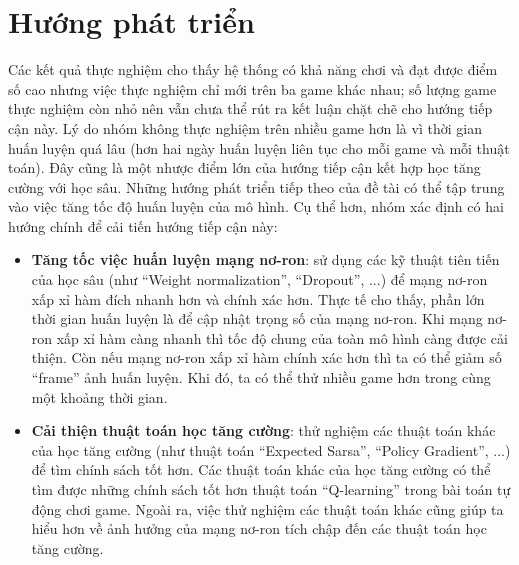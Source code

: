 \section{Hướng phát triển}
	Các kết quả thực nghiệm cho thấy hệ thống có khả năng chơi và đạt được điểm số cao nhưng việc thực nghiệm chỉ mới trên ba game khác nhau; số lượng game thực nghiệm còn nhỏ nên vẫn chưa thể rút ra kết luận chặt chẽ cho hướng tiếp cận này.
	Lý do nhóm không thực nghiệm trên nhiều game hơn là vì thời gian huấn luyện quá lâu (hơn hai ngày huấn luyện liên tục cho mỗi game và mỗi thuật toán).
	Đây cũng là một nhược điểm lớn của hướng tiếp cận kết hợp học tăng cường với học sâu.
	Những hướng phát triển tiếp theo của đề tài có thể tập trung vào việc tăng tốc độ huấn luyện của mô hình.
	Cụ thể hơn, nhóm xác định có hai hướng chính để cải tiến hướng tiếp cận này:
	\begin{itemize}
		\item \textbf{Tăng tốc việc huấn luyện mạng nơ-ron}: sử dụng các kỹ thuật tiên tiến của học sâu (như ``Weight normalization'', ``Dropout'', ...) để mạng nơ-ron xấp xỉ hàm đích nhanh hơn và chính xác hơn.
		Thực tế cho thấy, phần lớn thời gian huấn luyện là để cập nhật trọng số của mạng nơ-ron. 
		Khi mạng nơ-ron xấp xỉ hàm càng nhanh thì tốc độ chung của toàn mô hình càng được cải thiện.
		Còn nếu mạng nơ-ron xấp xỉ hàm chính xác hơn thì ta có thể giảm số ``frame'' ảnh huấn luyện.
		Khi đó, ta có thể thử nhiều game hơn trong cùng một khoảng thời gian.
		\item \textbf{Cải thiện thuật toán học tăng cường}: thử nghiệm các thuật toán khác của học tăng cường (như thuật toán ``Expected Sarsa'', ``Policy Gradient'', ...) để tìm chính sách tốt hơn.
		Các thuật toán khác của học tăng cường có thể tìm được những chính sách tốt hơn thuật toán ``Q-learning'' trong bài toán tự động chơi game.
		Ngoài ra, việc thử nghiệm các thuật toán khác cũng giúp ta hiểu hơn về ảnh hưởng của mạng nơ-ron tích chập đến các thuật toán học tăng cường.
	\end{itemize}
	